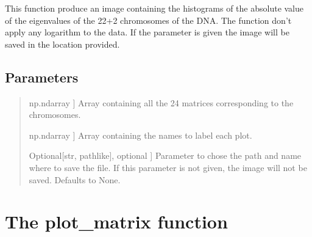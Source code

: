 \documentclass[letterpaper,10pt,english]{sphinxmanual}
\begin{document}
\begin{fulllineitems}
\label{\detokenize{index:hicanalysis.visualizegraph.plot_chromosomes_histograms}}
\pysigstartsignatures
{}
\pysigstopsignatures
\sphinxAtStartPar
This function produce an image containing the histograms of the absolute value 
of the eigenvalues of the 22+2 chromosomes of the DNA.
The function don’t apply any logarithm to the data.
If the parameter  is given the image will be saved in the location provided.


\subsection{Parameters}
\label{\detokenize{index:id16}}\begin{quote}
\begin{description}
\sphinxlineitem{matrices}{[}np.ndarray {]}
\sphinxAtStartPar
Array containing all the 24 matrices corresponding to the chromosomes.

\sphinxlineitem{names}{[}np.ndarray {]}
\sphinxAtStartPar
Array containing the names to label each plot.

\sphinxlineitem{savepath}{[}Optional{[}str, path\sphinxhyphen{}like{]}, optional {]}
\sphinxAtStartPar
Parameter to chose the path and name where to save the file. If this
parameter is not given, the image will not be saved. Defaults to None.

\end{description}
\end{quote}

\end{fulllineitems}



\section{The plot\_matrix function}
\label{\detokenize{index:the-plot-matrix-function}}
\end{document}

